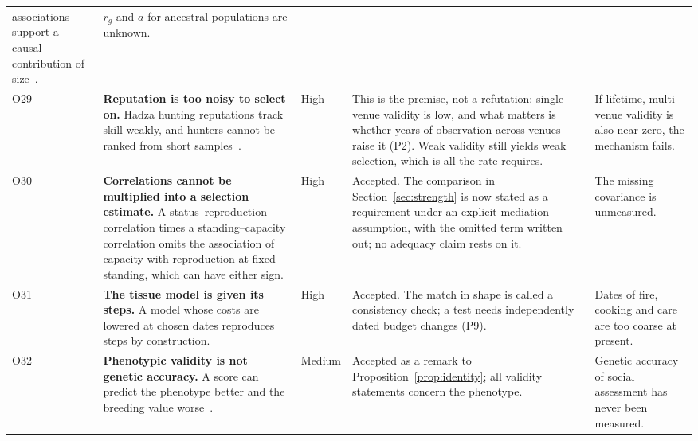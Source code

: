 \begin{table}[tp]
\begin{tabularx}{\textwidth}{@{}P{0.028\textwidth}P{0.225\textwidth}P{0.05\textwidth}LP{0.19\textwidth}@{}}
associations support a causal contribution of size~\cite{lee2019}. & $r_g$ and $a$ for ancestral populations are unknown.\\
O29 & \textbf{Reputation is too noisy to select on.} Hadza hunting reputations track skill weakly, and hunters cannot be
ranked from short samples~\cite{stibbardhawkes2018,hillkintigh2009}. & High & This is the premise, not a refutation:
single-venue validity is low, and what matters is whether years of observation across venues raise it (P2). Weak validity
still yields weak selection, which is all the rate requires. & If lifetime, multi-venue validity is also near zero, the
mechanism fails.\\
O30 & \textbf{Correlations cannot be multiplied into a selection estimate.} A status--reproduction correlation times a
standing--capacity correlation omits the association of capacity with reproduction at fixed standing, which can have either
sign. & High & Accepted. The comparison in Section~\ref{sec:strength} is now stated as a requirement under an explicit mediation
assumption, with the omitted term written out; no adequacy claim rests on it. & The missing covariance is unmeasured.\\
O31 & \textbf{The tissue model is given its steps.} A model whose costs are lowered at chosen dates reproduces steps by
construction. & High & Accepted. The match in shape is called a consistency check; a test needs independently dated budget
changes (P9). & Dates of fire, cooking and care are too coarse at present.\\
O32 & \textbf{Phenotypic validity is not genetic accuracy.} A score can predict the phenotype better and the breeding value
worse~\cite{hazel1943}. & Medium & Accepted as a remark to Proposition~\ref{prop:identity}; all validity statements concern the
phenotype. & Genetic accuracy of social assessment has never been measured.\\
\bottomrule
\end{tabularx}
\end{table}

